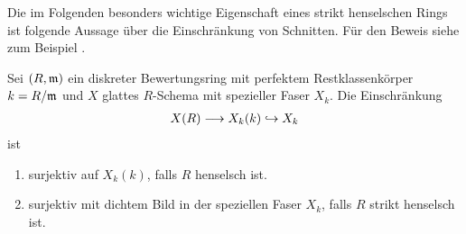 Die im Folgenden besonders wichtige Eigenschaft eines strikt
henselschen Rings ist folgende Aussage über die Einschränkung von
Schnitten. Für den Beweis siehe zum Beispiel
\cite[Proposition~IV.6.4]{silverman2}.
\begin{Satz}
  \label{thm:eigstrikthenselsch}
  Sei $(R,\mathfrak{m})$ ein diskreter Bewertungsring mit perfektem
  Restklassenkörper $k=R/\mathfrak{m}$ und $X$ glattes $R$-Schema mit spezieller
  Faser $X_k$.
  Die Einschränkung
  \begin{gather*}
    X(R)\longrightarrow X_k(k)\hookrightarrow X_k
  \end{gather*}
  ist
  \begin{enumerate}[label=(\alph*)]
  \item surjektiv auf $X_k(k)$, falls $R$ henselsch ist.
  \item surjektiv mit dichtem Bild in der speziellen Faser $X_k$,
    falls $R$ strikt henselsch ist.
  \end{enumerate}
\end{Satz}

